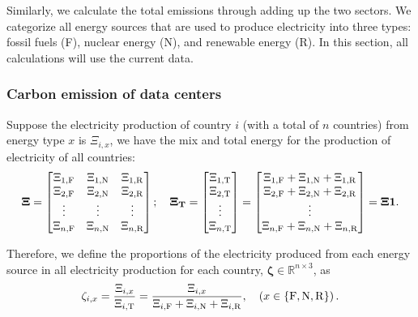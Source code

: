 \documentclass[12pt]{article}
\begin{document}
Similarly, we calculate the total emissions through adding up the two sectors. We categorize all energy sources that are used to produce electricity into three types: fossil fuels (F), nuclear energy (N), and renewable energy (R). In this section, all calculations will use the current data.

\subsubsection{Carbon emission of data centers}

Suppose the electricity production of country $i$ (with a total of $n$ countries) from energy type $x$ is $\Xi_{i,x}$, we have the mix and total energy for the production of electricity of all countries:
\begin{equation}
	\vb{\Xi} = \begin{bmatrix}
		\Xi_{1,\rm F} & \Xi_{1,\rm N} & \Xi_{1,\rm R} \\
		\Xi_{2,\rm F} & \Xi_{2,\rm N} & \Xi_{2,\rm R} \\
		\vdots & \vdots & \vdots \\
		\Xi_{n,\rm F} & \Xi_{n,\rm N} & \Xi_{n,\rm R} \\
	\end{bmatrix}; \quad
	\vb{\Xi_T}
	= \begin{bmatrix}
		\Xi_{1,\rm T} \\
		\Xi_{2,\rm T} \\
		\vdots \\
		\Xi_{n,\rm T} \\
	\end{bmatrix}
	= \begin{bmatrix}
		\Xi_{1,\rm F} + \Xi_{1,\rm N} + \Xi_{1,\rm R} \\
		\Xi_{2,\rm F} + \Xi_{2,\rm N} + \Xi_{2,\rm R} \\
		\vdots \\
		\Xi_{n,\rm F} + \Xi_{n,\rm N} + \Xi_{n,\rm R} \\
	\end{bmatrix}
	= \vb{\Xi} \vb{1}.
\end{equation}

Therefore, we define the proportions of the electricity produced from each energy source in all electricity production for each country, $\boldsymbol{\zeta} \in \mathbb{R}^{n \times 3}$, as
\begin{equation}
	\zeta_{i, x}
	= \frac{\Xi_{i, x}}{\Xi_{i,\rm T}}
	= \frac{\Xi_{i, x}}{\Xi_{i,\rm F} + \Xi_{i,\rm N} + \Xi_{i,\rm R}}, \quad
	\left(
		x \in \left\{ \rm F, N, R \right\}
	\right).
\end{equation}
\end{document}
